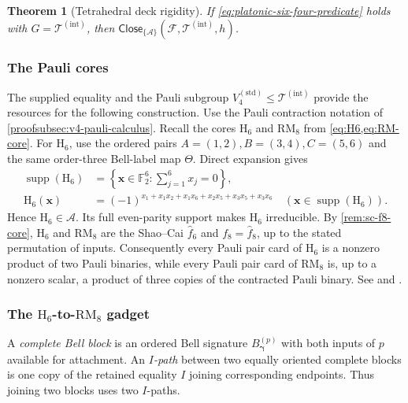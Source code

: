 \documentclass[11pt,letterpaper,onecolumn]{article}
\theoremstyle{plain}
\newtheorem{theorem}{Theorem}[section]
\theoremstyle{definition}
\theoremstyle{remark}
\newcommand{\Ftwo}{\mathbb F_2}
\newcommand{\cF}{\mathcal F}
\newcommand{\cA}{\mathscr A}
\newcommand{\KleinStd}{{V_4^{(\mathrm{std})}}}
\newcommand{\TetInt}{{\mathcal T^{(\mathrm{int})}}}
\newcommand{\Close}{\mathsf{Close}}
\newcommand{\supp}{\operatorname{supp}}
\newcommand{\RMcore}{\mathrm{RM}_8}
\newcommand{\Hcore}{\mathrm{H}_6}
\begin{document}
\begin{theorem}[Tetrahedral deck rigidity]
\label{thm:tetrahedral-deck-rigidity}
If \cref{eq:platonic-six-four-predicate} holds with \(G=\TetInt\), then
\(\Close_{\{\cA\}}(\cF,\TetInt,h)\).
\end{theorem}

\subsubsection{The Pauli cores}
\label{proofsubsec:v4-hcore}
\label{proofsubsec:v4-core-atlas}

The supplied equality and the Pauli subgroup \(\KleinStd\le\TetInt\)
provide the resources for the following construction. Use the Pauli
contraction notation of \cref{proofsubsec:v4-pauli-calculus}.
Recall the cores \(\Hcore\) and \(\RMcore\) from
\cref{eq:H6,eq:RM-core}. For \(\Hcore\), use the ordered pairs
\(A=(1,2),B=(3,4),C=(5,6)\) and the same order-three Bell-label map
\(\Theta\).
Direct expansion gives
\begin{align*}
 \supp(\Hcore)
   &=\left\{{\mathbf{x}}\in\Ftwo^6:\sum_{j=1}^6x_j=0\right\},\\
 \Hcore({\mathbf{x}})&=(-1)^{x_1+x_1x_2+x_1x_6+x_2x_5+x_3x_5+x_3x_6}
   \quad({\mathbf{x}}\in\supp(\Hcore)).
\end{align*}
Hence \(\Hcore\in\cA\). Its full even-parity support makes
\(\Hcore\) irreducible.
By \cref{rem:sc-f8-core}, \(\Hcore\) and \(\RMcore\) are
the Shao--Cai \(\widehat f_6\) and \(f_8=\widehat f_8\), up to the stated
permutation of inputs.  Consequently every Pauli pair card of \(\Hcore\) is a
nonzero product of two Pauli binaries, while every Pauli pair card of
\(\RMcore\) is, up to a nonzero scalar, a product of three copies of the
contracted Pauli binary. See
\cite[full version, Definition~6.12 and Lemma~6.13]{ShaoCai2020} and
\cite[Theorems~13--14]{CaiFuShao2020Entanglement}.

\subsubsection{The \texorpdfstring{\(\Hcore\)-to-\(\RMcore\)}{H6-to-RM8} gadget}
\label{proofsubsec:v4-H6-to-R8}

A \emph{complete Bell block} is an ordered Bell signature \(B_{\boldsymbol{\gamma}}^{(p)}\) with
both inputs of \(p\) available for attachment.  An \emph{\(I\)-path} between
two equally oriented complete blocks is one copy of the retained equality
\(I\) joining corresponding endpoints. Thus joining two blocks uses two \(I\)-paths.
\end{document}
